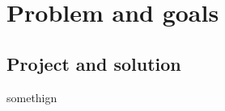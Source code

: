 \section{Problem and goals}
\label{sec:Problem-and-goals}

\subsection{Project and solution}
\label{subsec:Project-or-Solution}

somethign 	